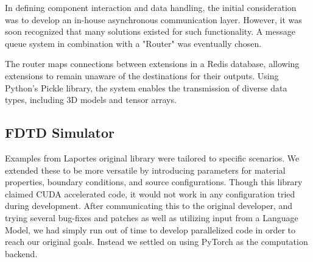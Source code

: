 \documentclass[11pt, a4paper, titlepage]{article}
\begin{document}
In defining component interaction and data handling, the initial consideration was to develop an in-house asynchronous communication layer. However, it was soon recognized that many solutions existed for such functionality. A message queue system in combination with a "Router" was eventually chosen.

The router maps connections between extensions in a Redis database, allowing extensions to remain unaware of the destinations for their outputs. Using Python's Pickle library, the system enables the transmission of diverse data types, including 3D models and tensor arrays.

\subsection{FDTD Simulator}

Examples from Laportes\cite{laporte20} original library were tailored to specific scenarios. We extended these to be more versatile by introducing parameters for material properties, boundary conditions, and source configurations. Though this library claimed CUDA accelerated code, it would not work in any configuration tried during development. After communicating this to the original developer, and trying several bug-fixes and patches as well as utilizing input from a Language Model, we had simply run out of time to develop parallelized code in order to reach our original goals. Instead we settled on using PyTorch as the computation backend.
\end{document}
